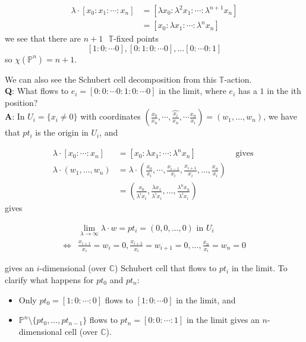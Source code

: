 \documentclass{amsart}
\newcommand{\PP}{\mathbb{P}}\newcommand{\A}{\mathbb{A}}\newcommand{\Z}{\mathbb{Z}}\newcommand{\C}{\mathbb{C}}\newcommand{\N}{\mathbb{N}}\newcommand{\T}{\mathbb{T}}
\begin{document}
\begin{align*} \lambda \cdot [x_0: x_1: \cdots : x_n] &= [\lambda x_0 : \lambda^2 x_1: \cdots : \lambda^{n+1}x_n]\\
&= [x_0: \lambda x_1: \cdots : \lambda^n x_n] \end{align*} we see that there are $n+1 \text{ }\T$-fixed points \[ [1:0:\cdots 0], [0:1:0:\cdots 0], \dots [0:\cdots 0:1] \] so $\chi(\PP^n)=n+1$. 

We can also see the Schubert cell decomposition from this $\T$-action.\\

\textbf{Q}: What flows to $e_i = [0:0:\cdots 0:1:0:\cdots 0]$ in the limit, where $e_i$ has a $1$ in the ith position?\\

\textbf{A}: In $U_i = \{x_i\neq 0 \}$ with coordinates $(\frac{x_0}{x_n}, \cdots, \hat{\frac{x_i}{x_n}}, \cdots \frac{x_n}{x_i} ) = (w_1, \dots, w_n)$, we have that $pt_i$ is the origin in $U_i$, and 

\begin{align*}
    \lambda \cdot  [x_0: \cdots :x_n] &= [x_0: \lambda x_1: \cdots :\lambda^n x_n ] &\text{ gives }\\
    \lambda \cdot (w_1, \dots, w_n) &= \lambda \cdot \left( \frac{ x_0}{x_i}, \cdots, \frac{x_{i-1}}{x_i}, \frac{x_{i+1}}{x_i}, \dots, \frac{x_n}{x_i} \right)\\
    &= \left( \frac{x_0}{\lambda^i x_i}, \frac{\lambda x_1}{\lambda^i x_i}, \dots, \frac{ \lambda^n x_n}{\lambda^i x_i} \right)
\end{align*} gives 

\begin{align*}
    &\lim_{\lambda \rightarrow \infty} \lambda \cdot w = pt_i = (0,0,\dots, 0) \text{ in }U_i \\[.2cm]
    \iff &\frac{x_{i+1}}{x_i} = w_i = 0, \frac{x_{i+2}}{x_i} = w_{i+1} = 0, \dots, \frac{x_n}{x_i} = w_n=0 \end{align*} 

    gives an $i$-dimensional (over $\C$) Schubert cell that flows to $pt_i$ in the limit. To clarify what happens for $pt_0$ and $pt_n$: \\
    \begin{itemize}
        \item Only $pt_0 = [1:0:\cdots :0]$ flows to $[1:0:\cdots 0]$ in the limit, and \\
        \item $\PP^n \setminus \{pt_0, \dots, pt_{n-1} \}$ flows to $pt_n = [0:0:\cdots :1]$ in the limit gives an $n$-dimensional cell (over $\C$). 
    \end{itemize}
\end{document}
